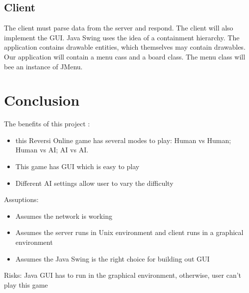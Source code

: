 \documentclass{article}
\begin{document}
\subsection{Client}
The client must parse data from the server and respond. The client will also
implement the GUI. Java Swing uses the idea of a containment hierarchy. The application
contains drawable entities, which themselves may contain drawables. Our application will contain
a menu cass and a board class. The menu class will bee an instance of JMenu.

\section{Conclusion} %
The benefits of this project : 
\begin{itemize}
\item this Reversi Online game has several modes to play: Human vs Human; Human vs AI; AI vs AI. 
\item This game has GUI which is easy to play
\item Different AI settings allow user to vary the difficulty
\end{itemize}
Assuptions:
\begin{itemize}
\item Assumes the network is working 
\item Assumes the server runs in Unix environment and client runs in a graphical environment
\item Assumes the Java Swing is the right choice for building out GUI
\end{itemize}
Risks: Java GUI has to run in the  graphical environment, otherwise, user can’t play this game
\end{document}
